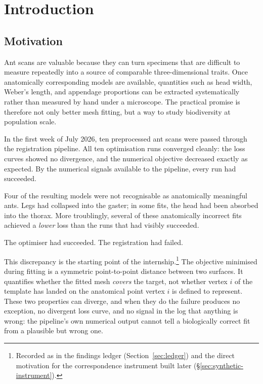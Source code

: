 \chapter{Introduction}
\label{ch:introduction}

\section{Motivation}

Ant scans are valuable because they can turn specimens that are difficult to
measure repeatedly into a source of comparable three-dimensional traits. Once
anatomically corresponding models are available, quantities such as head
width, Weber's length, and appendage proportions can be extracted
systematically rather than measured by hand under a microscope. The practical
promise is therefore not only better mesh fitting, but a way to study
biodiversity at population scale.

In the first week of July 2026, ten preprocessed ant scans were passed
through the registration pipeline. All ten optimisation runs converged
cleanly: the loss curves showed no divergence, and the numerical objective
decreased exactly as expected. By the numerical signals available to the pipeline, every run had
succeeded.

Four of the resulting models were not recognisable as anatomically meaningful
ants. Legs had collapsed into the gaster; in some fits, the head had been
absorbed into the thorax. More troublingly, several of these anatomically
incorrect fits achieved a \emph{lower} loss than the runs that had visibly
succeeded.

The optimiser had succeeded. The registration had failed.

%
This discrepancy is the starting point of the internship.\footnote{Recorded
as  in the findings ledger (Section~\ref{sec:ledger}) and the direct
motivation for the correspondence instrument built later
(\S\ref{sec:synthetic-instrument}).} The objective minimised during fitting
is a symmetric point-to-point distance between two surfaces. It quantifies
whether the fitted mesh \emph{covers} the target, not whether vertex $i$ of
the template has landed on the anatomical point vertex $i$ is defined to
represent. These two properties can diverge, and when they do the failure
produces no exception, no divergent loss curve, and no signal in the log
that anything is wrong: the pipeline's own numerical output cannot tell a
biologically correct fit from a plausible but wrong one.

